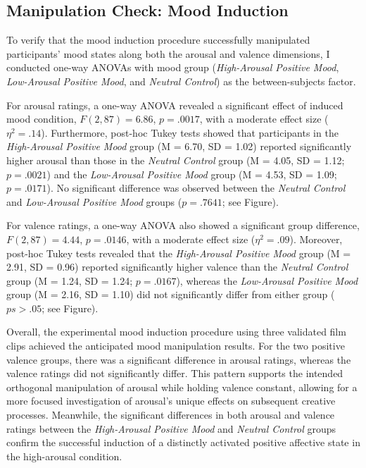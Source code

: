 \documentclass[../MA_Thesis.tex]{subfiles}
\begin{document}
\subsection*{Manipulation Check: Mood Induction}
To verify that the mood induction procedure successfully manipulated participants’ mood states along both the arousal and valence dimensions, I conducted one-way ANOVAs with mood group (\textit{High-Arousal Positive Mood}, \textit{Low-Arousal Positive Mood}, and
\textit{Neutral Control}) as the between-subjects factor.

For arousal ratings, a one-way ANOVA revealed a significant effect of induced mood condition, $F(2, 87) = 6.86$, $p = .0017$, with a moderate effect size ($\eta^2 = .14$). Furthermore, post-hoc Tukey tests showed that participants in the \textit{High-Arousal Positive Mood} group (M = 6.70, SD = 1.02) reported significantly higher arousal than those in the \textit{Neutral Control} group (M = 4.05, SD = 1.12; $p = .0021$) and the \textit{Low-Arousal Positive Mood} group (M = 4.53, SD = 1.09; $p = .0171$). No significant difference was observed between the \textit{Neutral Control} and \textit{Low-Arousal Positive Mood} groups ($p = .7641$; see Figure). 

For valence ratings, a one-way ANOVA also showed a significant group difference, $F(2, 87) = 4.44$, $p = .0146$, with a moderate effect size ($\eta^2 = .09$). Moreover, post-hoc Tukey tests revealed that the \textit{High-Arousal Positive Mood} group (M = 2.91, SD = 0.96) reported significantly higher valence than the \textit{Neutral Control} group (M = 1.24, SD = 1.24; $p = .0167$), whereas the \textit{Low-Arousal Positive Mood} group (M = 2.16, SD = 1.10) did not significantly differ from either group ($ps > .05$; see Figure). 

Overall, the experimental mood induction procedure using three validated film clips achieved the anticipated mood manipulation results. For the two positive valence groups, there was a significant difference in arousal ratings, whereas the valence ratings did not significantly differ. This pattern supports the intended orthogonal manipulation of arousal while holding valence constant, allowing for a more focused investigation of arousal's unique effects on subsequent creative processes. Meanwhile, the significant differences in both arousal and valence ratings between the \textit{High-Arousal Positive Mood} and \textit{Neutral Control} groups confirm the successful induction of a distinctly activated positive affective state in the high-arousal condition.
\end{document}
